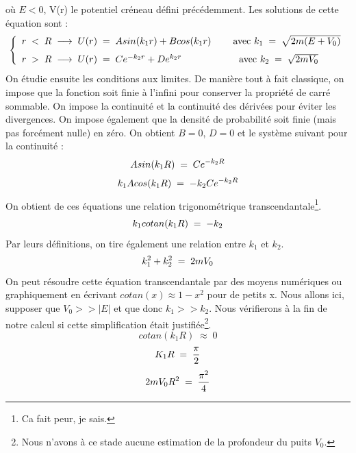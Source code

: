 où $E<0$, V(r) le potentiel créneau défini précédemment.
Les solutions de cette équation sont :
\begin{equation*}
    \left\{
    \begin{array}{ll}
        r \;<\; R\; \longrightarrow \; U(r) \; = \; Asin(k_1r) + B cos(k_1 r) \qquad \; \text{avec } k_1 \; = \; \sqrt{2m(E+V_0)}
    \\[7pt]
         r \;>\; R\; \longrightarrow \; U(r) \; = \; C e^{-k_2r} + D e^{k_2 r} \qquad \qquad \qquad \text{avec } k_2 \; = \; \sqrt{2mV_0}
    \end{array}
    \right.
\end{equation*}
On étudie ensuite les conditions aux limites. De manière tout à fait classique, on impose que la fonction soit finie à l'infini pour conserver la propriété de carré sommable. On impose la continuité et la continuité des dérivées pour éviter les divergences. On impose également que la densité de probabilité soit finie (mais pas forcément nulle) en zéro. On obtient $B = 0$, $D = 0$ et le système suivant pour la continuité :
\begin{equation*}
    Asin(k_1R) \; = \; Ce^{-k_2 R}
\end{equation*}
\begin{equation*}
    k_1Acos(k_1R) \; = \; -k_2 C e^{-k_2 R}
\end{equation*}
On obtient de ces équations une relation trigonométrique transcendantale\footnote{Ca fait peur, je sais.}.
\begin{equation*}
    k_1 cotan(k_1R)  \; = \; -k_2
\end{equation*}
Par leurs définitions, on tire également une relation entre $k_1$ et $k_2$.
\begin{equation*}
    k_1^2 + k_2^2 \; = \; 2mV_0
\end{equation*}
On peut résoudre cette équation transcendantale par des moyens numériques ou graphiquement en écrivant $cotan(x) \approx 1 - x^2$ pour de petits x. Nous allons ici, supposer que $V_0 >> |E|$ et que donc $k_1 >> k_2$. Nous vérifierons à la fin de notre calcul si cette simplification était justifiée\footnote{Nous n'avons à ce stade aucune estimation de la profondeur du puits $V_0$.}.
\begin{equation*}
    cotan(k_1R) \; \approx \; 0
\end{equation*}
\begin{equation*}
    K_1 R \; = \; \dfrac{\pi}{2}
\end{equation*}
\begin{equation*}
    2mV_0 R^2 \; = \; \dfrac{\pi^2}{4}
\end{equation*}
